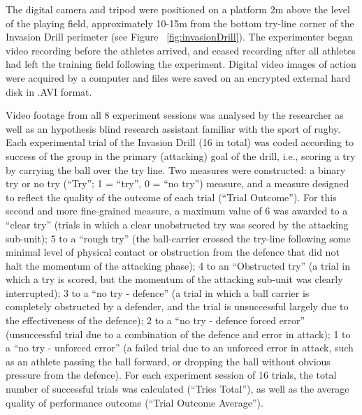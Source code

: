 The digital camera and tripod were positioned on a platform 2m above the level of the playing field, approximately 10-15m from the bottom try-line corner of the Invasion Drill perimeter (see Figure ~\ref{fig:invasionDrill}). The experimenter began video recording before the athletes arrived, and ceased recording after all athletes had left the training field following the experiment. Digital video images of action were acquired by a computer and files were saved on an encrypted external hard disk in .AVI format.


Video footage from all 8 experiment sessions was analysed by the researcher as well as an hypothesis blind research assistant familiar with the sport of rugby.  Each experimental trial of the Invasion Drill (16 in total) was coded according to success of the group in the primary (attacking) goal of the drill, i.e., scoring a try by carrying the ball over the try line.  Two measures were constructed: a binary try or no try (``Try''; 1 = ``try'', 0 = ``no try'') measure, and a measure designed to reflect the quality of the outcome of each trial (``Trial Outcome''). For this second and more fine-grained measure, a maximum value of 6 was awarded to a ``clear try'' (trials in which a clear unobstructed try was scored by the attacking sub-unit); 5 to a ``rough try'' (the ball-carrier crossed the try-line following some minimal level of physical contact or obstruction from the defence that did not halt the momentum of the attacking phase); 4 to an ``Obstructed try'' (a trial in which a try is scored, but the momentum of the attacking sub-unit was clearly interrupted); 3 to a ``no try - defence'' (a trial in which a ball carrier is completely obstructed by a defender, and the trial is unsuccessful largely due to the effectiveness of the defence); 2 to a ``no try - defence forced error'' (unsuccessful trial due to a combination of the defence and error in attack); 1 to a ``no try - unforced error'' (a failed trial due to an unforced error in attack, such as an athlete passing the ball forward, or dropping the ball without obvious pressure from the defence).  For each experiment session of 16 trials, the total number of successful trials was calculated (``Tries Total''), as well as the average quality of performance outcome (``Trial Outcome Average'').


